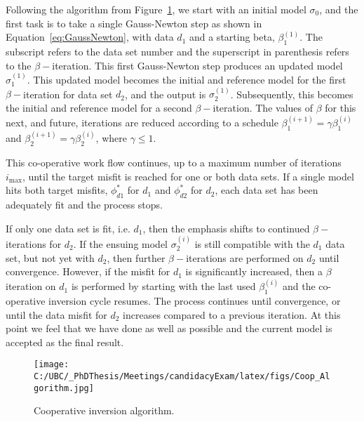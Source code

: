 \documentclass[letterpaper,11pt]{article}
\begin{document}
Following the algorithm from Figure~\ref{fig:CoopAlgorithm}, we start with an initial model $ \sigma_0 $, and the first task is to take a single Gauss-Newton step as shown in Equation~\ref{eq:GaussNewton}, with data $d_1$ and a starting beta, $\beta_1^{(1)}$. The subscript refers to the data set number and the superscript in parenthesis refers to the $\beta-$iteration.  This first Gauss-Newton step produces an updated model $ \sigma_1^{(1)}$.   This updated model becomes the initial and reference model for the first $\beta-$iteration for data set $ d_2 $, and the output is  $ \sigma_2^{(1)}$.  Subsequently, this becomes the initial and reference model for a second $\beta-$iteration. The values of $\beta$ for this next, and future, iterations are reduced according to a schedule $\beta_1^{(i+1)} = \gamma \beta_1^{(i)}$ and $\beta_2^{(i+1)} = \gamma \beta_2^{(i)}$, where $\gamma \leq 1$.  

This co-operative work flow continues, up to a maximum number of iterations $ i_{\mathrm{max}} $, until the target misfit is reached for one or both data sets.  If a single model hits both target misfits, $ \phi_{d1}^{*} $ for $d_1$ and  $ \phi_{d2}^{*} $ for $d_2$, each data set has been adequately fit and the process stops.

If only one data set is fit, i.e. $d_1$, then the emphasis shifts to continued $\beta-$iterations for $d_2$. If the ensuing model $\sigma_2^{(i)}$ is still compatible with the $d_1$ data set, but not yet with $ d_2 $, then further $\beta-$iterations are performed on $d_2$ until convergence. However, if the misfit for $d_1$ is significantly increased, then a $\beta$ iteration on $d_1$ is performed by starting with the last used $\beta_1^{(i)}$ and the co-operative inversion cycle resumes. The process continues until convergence, or until the data misfit for $d_2$ increases compared to a previous iteration. At this point we feel that we have done as well as possible and the current model is accepted as the final result. 
\begin{figure}[h]
  \centering
  \texttt{[image: C:/UBC/\_PhDThesis/Meetings/candidacyExam/latex/figs/Coop\_Algorithm.jpg]}
  \caption{Cooperative inversion algorithm.}
  \label{fig:CoopAlgorithm}
\end{figure}
\end{document}
